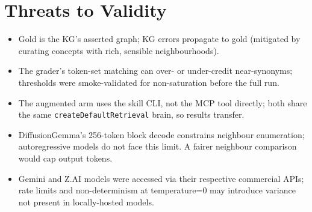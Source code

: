 \documentclass[11pt]{article}
\begin{document}
\section{Threats to Validity}
\begin{samepage}
\begin{itemize}[leftmargin=1.3em]
\item Gold is the KG's asserted graph; KG errors propagate to gold (mitigated by curating
      concepts with rich, sensible neighbourhoods).
\item The grader's token-set matching can over- or under-credit near-synonyms; thresholds were
      smoke-validated for non-saturation before the full run.
\item The augmented arm uses the skill CLI, not the MCP tool directly; both share the same
      \texttt{createDefaultRetrieval} brain, so results transfer.
\item DiffusionGemma's 256-token block decode constrains neighbour enumeration; autoregressive
      models do not face this limit. A fairer neighbour comparison would cap output tokens.
\item Gemini and Z.AI models were accessed via their respective commercial APIs; rate limits and
      non-determinism at temperature=0 may introduce variance not present in locally-hosted models.
\end{itemize}
\end{samepage}

\printbibliography[title={References}]
\end{document}
